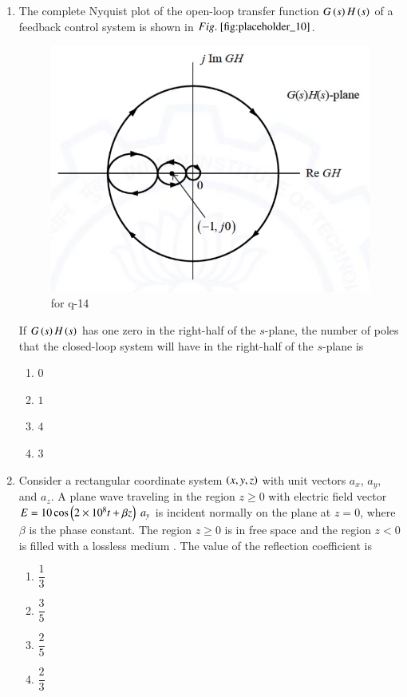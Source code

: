 \documentclass[journal,12pt,onecolumn]{IEEEtran}
\theoremstyle{remark}
\begin{document}
\begin{enumerate}
\item The complete Nyquist plot of the open-loop transfer function $G\left(s\right)H\left(s\right)$ of a feedback control system is shown in $\figref{fig:placeholder_10}$.  
\begin{figure}[H]
    \centering
    \includegraphics[width=0.4\columnwidth]{figs/10.png}
    \caption{\centering for q-14}
    \label{fig:placeholder_10}
\end{figure}
If $G\left(s\right)H\left(s\right)$ has one zero in the right-half of the $s$-plane, the number of poles that the closed-loop system will have in the right-half of the $s$-plane is
\begin{multicols}{4}
\begin{enumerate}
\item $0$
\item $1$
\item $4$
\item $3$
\end{enumerate}
\end{multicols}
\hfill {}

\item Consider a rectangular coordinate system $\left(x, y, z\right)$ with unit vectors ${a}_x$, ${a}_y$, and ${a}_z$. A plane wave traveling in the region $z \geq  0$ with electric field vector $E = 10 \cos\left(2 \times 10^8 t + \beta z\right) \ a_y$ is incident normally on the plane at $z = 0$, where $\beta$ is the phase constant. The region $z \geq 0$ is in free space and the region $z < 0$ is filled with a lossless medium . The value of the reflection coefficient is
\begin{multicols}{5}
\begin{enumerate}
\item $\dfrac{1}{3}$
\item $\dfrac{3}{5}$
\item $\dfrac{2}{5}$
\item $\dfrac{2}{3}$
\end{enumerate}
\end{multicols}
\hfill {}




\end{enumerate}
\end{document}
